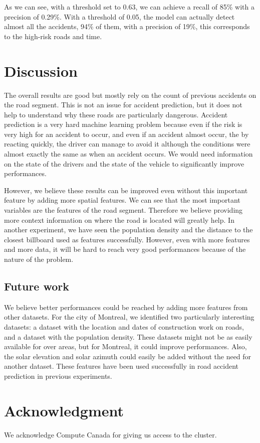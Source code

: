 \documentclass[conference]{IEEEtran}
\begin{document}
As we can see, with a threshold set to 0.63, we can achieve a recall of 85\% with a precision of 0.29\%. With a threshold of 0.05, the model can actually detect almost all the accidents, 94\% of them, with a precision of 19\%, this corresponds to the high-risk roads and time.

\section{Discussion}
The overall results are good but mostly rely on the count of previous accidents on the road segment. This is not an issue for accident prediction, but it does not help to understand why these roads are particularly dangerous. Accident prediction is a very hard machine learning problem because even if the risk is very high for an accident to occur, and even if an accident almost occur, the by reacting quickly, the driver can manage to avoid it although the conditions were almost exactly the same as when an accident occurs. We would need information on the state of the drivers and the state of the vehicle to significantly improve performances. 

However, we believe these results can be improved even without this important feature by adding more spatial features. We can see that the most important variables are the features of the road segment. Therefore we believe providing more context information on where the road is located will greatly help. In another experiment, we have seen the population density and the distance to the closest billboard used as features successfully. However, even with more features and more data, it will be hard to reach very good performances because of the nature of the problem.

\subsection{Future work}
We believe better performances could be reached by adding more features from other datasets. For the city of Montreal, we identified two particularly interesting datasets: a dataset with the location and dates of construction work on roads, and a dataset with the population density. These datasets might not be as easily available for over areas, but for Montreal, it could improve performances. Also, the solar elevation and solar azimuth could easily be added without the need for another dataset. These features have been used successfully in road accident prediction in previous experiments.

\section*{Acknowledgment}

We acknowledge Compute Canada for giving us access to the cluster.



\end{document}
